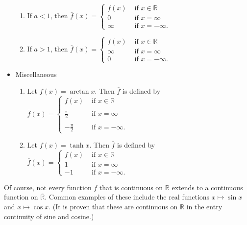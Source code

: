 \documentclass[12pt]{article}
\begin{document}
\begin{itemize}
\begin{enumerate}

\item If $a<1$, then $\displaystyle \overline{f}(x)=\begin{cases}
f(x) & \text{ if } x \in \mathbb{R} \\
0 & \text{ if } x=\infty \\
\infty & \text{ if } x=-\infty.  \end{cases}$

\item If $a>1$, then $\displaystyle \overline{f}(x)=\begin{cases}
f(x) & \text{ if } x \in \mathbb{R} \\
\infty & \text{ if } x=\infty \\
0 & \text{ if } x=-\infty.  \end{cases}$

\end{enumerate}

\item Miscellaneous 

\begin{enumerate}

\item Let $f(x)=\arctan x$.  Then $\overline{f}$ is defined by $\displaystyle \overline{f}(x)=\begin{cases}
f(x) & \text{ if } x \in \mathbb{R} \\
& \\
\displaystyle \frac{\pi}{2} & \text{ if } x=\infty \\
& \\
\displaystyle -\frac{\pi}{2} & \text{ if } x=-\infty.  \end{cases}$

\item Let $f(x)=\tanh x$.  Then $\overline{f}$ is defined by $\displaystyle \overline{f}(x)=\begin{cases}
f(x) & \text{ if } x \in \mathbb{R} \\
1 & \text{ if } x=\infty \\
-1 & \text{ if } x=-\infty.  \end{cases}$

\end{enumerate}
\end{itemize}

Of course, not every function $f$ that is continuous on $\mathbb{R}$ extends to a continuous function on $\overline{\mathbb{R}}$.  Common examples of these include the real functions $x \mapsto \sin x$ and $x \mapsto \cos x$.  (It is proven that these are continuous on $\mathbb{R}$ in the entry continuity of sine and cosine.)
\end{document}

